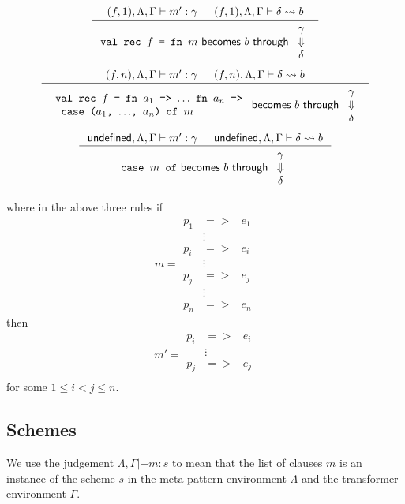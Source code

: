 \[
\inference{
  (f, 1), \Lambda, \Gamma |- m' : \gamma &
  (f, 1), \Lambda, \Gamma |- \delta \leadsto b
}{\becomesthrough{\texttt{val
      rec $f$ = fn $m$}}{b}{
    \begin{array}{c}
      \gamma\\
      \Downarrow\\
      \delta
    \end{array}
}}
\]
\[
\inference{
  (f, n), \Lambda, \Gamma |- m' : \gamma &
  (f, n), \Lambda, \Gamma |- \delta \leadsto b
}{\becomesthrough{
    \begin{array}{l}
      \texttt{val rec $f$ = fn $a_1$ => $\ldots$ fn $a_n$ =>}\\
      \texttt{  case ($a_1$, $\ldots$, $a_n$) of $m$}
    \end{array}
  }{b}{
    \begin{array}{c}
      \gamma\\
      \Downarrow\\
      \delta
    \end{array}
}}
\]
\[
\inference{
  \textsf{undefined}, \Lambda, \Gamma |- m' : \gamma &
  \textsf{undefined}, \Lambda, \Gamma |- \delta \leadsto b
}
{
  \becomesthrough{\texttt{case $m$ of}}{b}{
    \begin{array}{c}
      \gamma\\
      \Downarrow\\
      \delta
    \end{array}
  }
}
\]

where in the above three rules if
\[
m =
\begin{array}{lll}
  p_1 &=>& e_1\\
  &\vdots&\\
  p_i &=>& e_i\\
  &\vdots&\\
  p_j &=>& e_j\\
  &\vdots&\\
  p_n &=>& e_n
\end{array}
\]
then
\[
m' =
\begin{array}{lll}
  p_i &=>& e_i\\
  &\vdots&\\
  p_j &=>& e_j\\
\end{array}
\]
for some $1 \leq i < j \leq n$.

\subsection{Schemes}
We use the judgement $\Lambda, \Gamma |- m : s$ to mean that the list of clauses $m$ is
an instance of the scheme $s$ in the meta pattern environment $\Lambda$ and the
transformer environment $\Gamma$.

